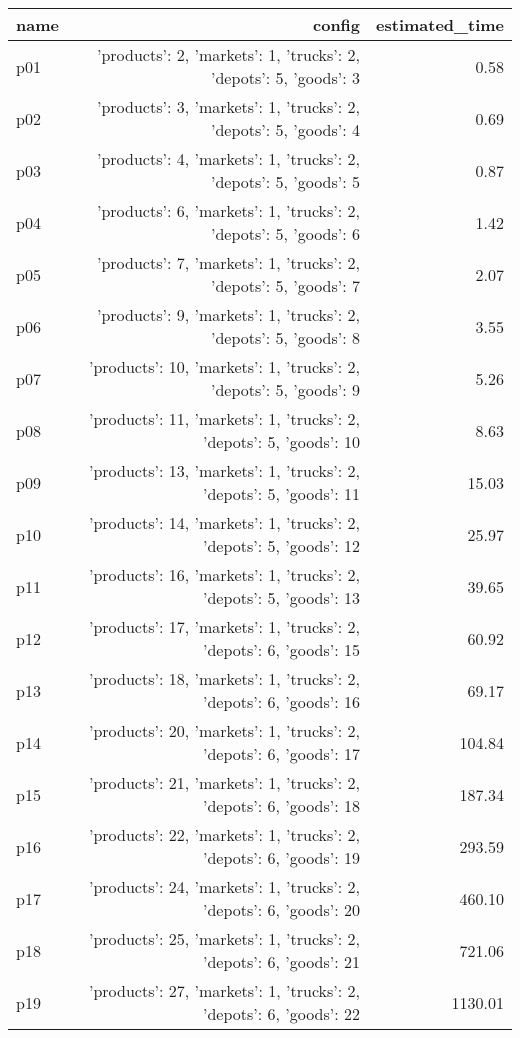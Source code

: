 \documentclass{article}
\begin{document}
                            \begin{center}
                            \scriptsize
                            \begin{tabular}{@{}l|r|r@{}}
                            name & config & estimated\_time\\\midrule
                              p01&{'products': 2, 'markets': 1, 'trucks': 2, 'depots': 5, 'goods': 3}&0.58\\
  p02&{'products': 3, 'markets': 1, 'trucks': 2, 'depots': 5, 'goods': 4}&0.69\\
  p03&{'products': 4, 'markets': 1, 'trucks': 2, 'depots': 5, 'goods': 5}&0.87\\
  p04&{'products': 6, 'markets': 1, 'trucks': 2, 'depots': 5, 'goods': 6}&1.42\\
  p05&{'products': 7, 'markets': 1, 'trucks': 2, 'depots': 5, 'goods': 7}&2.07\\
  p06&{'products': 9, 'markets': 1, 'trucks': 2, 'depots': 5, 'goods': 8}&3.55\\
  p07&{'products': 10, 'markets': 1, 'trucks': 2, 'depots': 5, 'goods': 9}&5.26\\
  p08&{'products': 11, 'markets': 1, 'trucks': 2, 'depots': 5, 'goods': 10}&8.63\\
  p09&{'products': 13, 'markets': 1, 'trucks': 2, 'depots': 5, 'goods': 11}&15.03\\
  p10&{'products': 14, 'markets': 1, 'trucks': 2, 'depots': 5, 'goods': 12}&25.97\\
  p11&{'products': 16, 'markets': 1, 'trucks': 2, 'depots': 5, 'goods': 13}&39.65\\
  p12&{'products': 17, 'markets': 1, 'trucks': 2, 'depots': 6, 'goods': 15}&60.92\\
  p13&{'products': 18, 'markets': 1, 'trucks': 2, 'depots': 6, 'goods': 16}&69.17\\
  p14&{'products': 20, 'markets': 1, 'trucks': 2, 'depots': 6, 'goods': 17}&104.84\\
  p15&{'products': 21, 'markets': 1, 'trucks': 2, 'depots': 6, 'goods': 18}&187.34\\
  p16&{'products': 22, 'markets': 1, 'trucks': 2, 'depots': 6, 'goods': 19}&293.59\\
  p17&{'products': 24, 'markets': 1, 'trucks': 2, 'depots': 6, 'goods': 20}&460.10\\
  p18&{'products': 25, 'markets': 1, 'trucks': 2, 'depots': 6, 'goods': 21}&721.06\\
  p19&{'products': 27, 'markets': 1, 'trucks': 2, 'depots': 6, 'goods': 22}&1130.01\\

\end{tabular}
\end{center}
\end{document}
